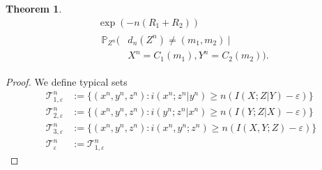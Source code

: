 \documentclass[journal]{IEEEtran}
\newcommand{\codebookRateOne}{R_1}
\newcommand{\codebookRateTwo}{R_2}
\newcommand{\channelInOne}{X}
\newcommand{\channelInOneAlphElement}{x}
\newcommand{\channelInTwo}{Y}
\newcommand{\channelInTwoAlphElement}{y}
\newcommand{\channelOut}{Z}
\newcommand{\channelOutAlphElement}{z}
\newcommand{\codebookOneWord}[1]{C_1(#1)}
\newcommand{\codebookTwoWord}[1]{C_2(#1)}
\newcommand{\codewordIndex}{m}
\newcommand{\codebookBlocklength}{n}
\newcommand{\mutualInformation}[2]{I(#1;#2)}
\newcommand{\mutualInformationConditional}[3]{I(#1;#2|#3)}
\newcommand{\informationDensity}[2]{i({#1};{#2})}
\newcommand{\informationDensityConditional}[3]{i({#1};{#2} | {#3})}
\newcommand{\Probability}{\mathbb{P}}
\newcommand{\typicalityParam}{\varepsilon}
\newcommand{\typicalSetIndex}[3]{\mathcal{T}_{#3,#1}^{#2}}
\newcommand{\typicalSet}[2]{\mathcal{T}_{#1}^{#2}}
\newcommand{\codebookDecoder}{d}
\newtheorem{theorem}{Theorem}
\begin{document}
\begin{theorem}
\begin{align*}
  &\exp(-\codebookBlocklength(\codebookRateOne+\codebookRateTwo))
  \\
  &
  \begin{aligned}
    \Probability_{\channelOut^\codebookBlocklength} \Big(
          &\codebookDecoder_\codebookBlocklength(\channelOut^\codebookBlocklength) \neq (\codewordIndex_1, \codewordIndex_2)
          ~\big|~
          \\
          &\channelInOne^\codebookBlocklength = \codebookOneWord{\codewordIndex_1},
          \channelInTwo^\codebookBlocklength = \codebookTwoWord{\codewordIndex_2}
        \Big).
  \end{aligned}
\end{align*}
\end{theorem}
\begin{proof}
We define typical sets
\begin{align*}
\typicalSetIndex{\typicalityParam}{\codebookBlocklength}{1}
&:=
\{
  (\channelInOneAlphElement^\codebookBlocklength, \channelInTwoAlphElement^\codebookBlocklength, \channelOutAlphElement^\codebookBlocklength)
  :
  \informationDensityConditional{\channelInOneAlphElement^\codebookBlocklength}{\channelOutAlphElement^\codebookBlocklength}{\channelInTwoAlphElement^\codebookBlocklength}
  \geq
  \codebookBlocklength(\mutualInformationConditional{\channelInOne}{\channelOut}{\channelInTwo} - \typicalityParam)
\}
\\
\typicalSetIndex{\typicalityParam}{\codebookBlocklength}{2}
&:=
\{
  (\channelInOneAlphElement^\codebookBlocklength, \channelInTwoAlphElement^\codebookBlocklength, \channelOutAlphElement^\codebookBlocklength)
  :
  \informationDensityConditional{\channelInTwoAlphElement^\codebookBlocklength}{\channelOutAlphElement^\codebookBlocklength}{\channelInOneAlphElement^\codebookBlocklength}
  \geq
  \codebookBlocklength(\mutualInformationConditional{\channelInTwo}{\channelOut}{\channelInOne} - \typicalityParam)
\}
\\
\typicalSetIndex{\typicalityParam}{\codebookBlocklength}{3}
&:=
\{
  (\channelInOneAlphElement^\codebookBlocklength, \channelInTwoAlphElement^\codebookBlocklength, \channelOutAlphElement^\codebookBlocklength)
  :
  \informationDensity{\channelInOneAlphElement^\codebookBlocklength, \channelInTwoAlphElement^\codebookBlocklength}{\channelOutAlphElement^\codebookBlocklength}
  \geq
  \codebookBlocklength(\mutualInformation{\channelInOne, \channelInTwo}{\channelOut} - \typicalityParam)
\}
\\
\typicalSet{\typicalityParam}{\codebookBlocklength}
&:=
\typicalSetIndex{\typicalityParam}{\codebookBlocklength}{1}

\end{align*}
\end{proof}
\end{document}
